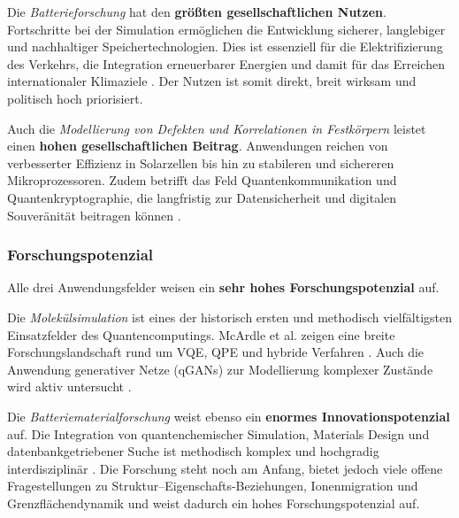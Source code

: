 \vspace{0.5em}

Die \textit{Batterieforschung} hat den \textbf{größten gesellschaftlichen Nutzen}. Fortschritte bei der Simulation ermöglichen die Entwicklung sicherer, langlebiger und nachhaltiger Speichertechnologien. Dies ist essenziell für die Elektrifizierung des Verkehrs, die Integration erneuerbarer Energien und damit für das Erreichen internationaler Klimaziele \cite{demir2024application}. Der Nutzen ist somit direkt, breit wirksam und politisch hoch priorisiert.

\vspace{0.5em}

Auch die \textit{Modellierung von Defekten und Korrelationen in Festkörpern} leistet einen \textbf{hohen gesellschaftlichen Beitrag}. Anwendungen reichen von verbesserter Effizienz in Solarzellen bis hin zu stabileren und sichereren Mikroprozessoren. Zudem betrifft das Feld Quantenkommunikation und Quantenkryptographie, die langfristig zur Datensicherheit und digitalen Souveränität beitragen können \cite{cao2023ab,bassett2019defect}.


\subsubsection{Forschungspotenzial}

Alle drei Anwendungsfelder weisen ein \textbf{sehr hohes Forschungspotenzial} auf.

\vspace{0.5em}

Die \textit{Molekülsimulation} ist eines der historisch ersten und methodisch vielfältigsten Einsatzfelder des Quantencomputings. McArdle et al. zeigen eine breite Forschungslandschaft rund um VQE, QPE und hybride Verfahren \cite{mcardle2020quantum}. Auch die Anwendung generativer Netze (qGANs) zur Modellierung komplexer Zustände wird aktiv untersucht \cite{zoufal2019quantum}.

\vspace{0.5em}

Die \textit{Batteriematerialforschung} weist ebenso ein \textbf{enormes Innovationspotenzial} auf. Die Integration von quantenchemischer Simulation, Materials Design und datenbankgetriebener Suche ist methodisch komplex und hochgradig interdisziplinär \cite{urban2016computational}. Die Forschung steht noch am Anfang, bietet jedoch viele offene Fragestellungen zu Struktur–Eigenschafts-Beziehungen, Ionenmigration und Grenzflächendynamik und weist dadurch ein hohes Forschungspotenzial auf.


